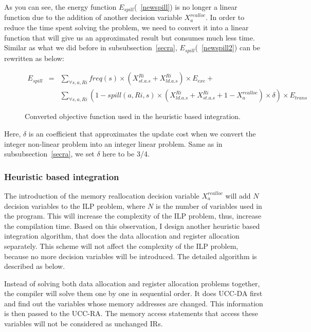 As you can see, the energy function $E_{spill}$(~\ref{newspill}) is no longer a linear function
due to the addition of another decision variable $X_{a}^{realloc}$.
In order to reduce the time spent solving the problem, we need to convert
it into a linear function that will give us an approximated result but 
consumes much less time.
Similar as what we did before in subsubsection~\ref{secra}, $E_{spill}$(~\ref{newspill2})
can be rewritten as below:
\begin{figure}[ht]
\begin{small}
\begin{eqnarray}
E_{spill} &=& \sum_{\forall s, a, Ri}
freq(s) \times (X_{st.a.s}^{Ri}+X_{ld.a.s}^{Ri}) \times E_{exe} + \nonumber\\
					& & \sum_{\forall s, a, Ri}(1-spill(a,Ri,s)\times
 (X_{ld.a.s}^{Ri}+X_{st.a.s}^{Ri}+1-X_{a}^{realloc})\times \delta )\times E_{trans} \label{newspill2} 
\end{eqnarray}
\end{small}
\caption{Converted objective function used in the heuristic based integration.}
\label{newObj2}
\end{figure}

Here, $\delta$ is an coefficient that approximates the update cost when we 
convert the integer non-linear problem into an integer linear problem.
Same as in subsubsection~\ref{secra}, we set $\delta$ here to be 3/4.


\subsubsection{Heuristic based integration}

The introduction of the memory reallocation decision variable $X_{a}^{realloc}$ will add $N$ 
decision variables to the ILP problem, where $N$ is the number of variables used in the
program. This will increase the complexity of the ILP problem, thus, increase the
compilation time.
Based on this observation, I design another heuristic based integration algorithm, that
does the data allocation and register allocation separately. This scheme will not
affect the complexity of the ILP problem, because no more decision variables will be introduced.
The detailed algorithm is described as below.

Instead of solving both data allocation and register allocation problems together, 
the compiler will solve them one by one in sequential order. It does UCC-DA first and find out the variables whose 
memory addresses are changed. This information is then passed to the UCC-RA. The memory access statements that
access these variables will not be considered as unchanged IRs.

